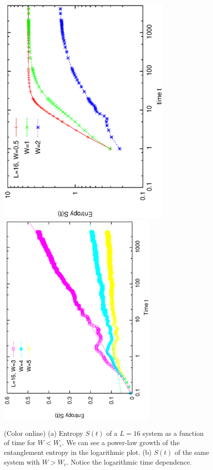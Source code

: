 \documentclass[prl,aps,epsf,showpacs,twocolumn,letterpaper]{revtex4}
\begin{document}
\begin{figure}[b]
  \includegraphics[angle=-90, origin=c,  width=3.4in]{newfig1a.ps}\\
  \vspace{-0.6in}
  \includegraphics[angle=-90,width=3.1in]{newfig1b.ps}\\
  \vspace{0.1in}
  \caption{(Color online) (a) Entropy $S(t)$ of a $L=16$ system as a function of
    time for $W < W_c$.
    We can see a power-law growth of the entanglement entropy in the logarithmic
    plot.
    (b) $S(t)$ of the same system with $W > W_c$. Notice the logarithmic time
    dependence.
  }
\label{fig2}
\end{figure}
\end{document}
